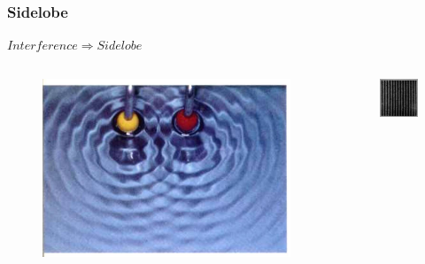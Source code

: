 \documentclass[compress=true]{beamer}
\begin{document}
\begin{frame}
  \frametitle{Sidelobe}
\begin{center}$Interference \Rightarrow Sidelobe$\end{center}
\begin{columns}
  \begin{column}{0.5\textwidth}
  \begin{figure}
    \includegraphics[height=0.4\textheight]{water.jpg}
  \end{figure}
\end{column}
\begin{column}{0.5\textwidth}
  \begin{figure}
    \includegraphics[height=0.5\textheight]{guang.jpg}
  \end{figure}
\end{column}
\end{columns}
\end{frame}
\end{document}
